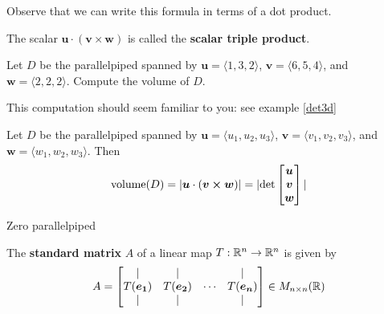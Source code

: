 Observe that we can write this formula in terms of a dot product.

\begin{definition}
        The scalar $\bm{u} \cdot (\bm{v \times w})$ is called the \textbf{scalar triple product}.
\end{definition}

\begin{example}
Let $D$ be the parallelpiped spanned by $\bm{u} = \langle 1, 3, 2 \rangle$, $\bm{v} = \langle 6, 5, 4 \rangle$, and $\bm{w} = \langle 2, 2, 2 \rangle$.  Compute the volume of $D$.

\end{example}

This computation should seem familiar to you: see example \ref{det3d}

\begin{theorem}
    Let $D$ be the parallelpiped spanned by $\bm{u} = \langle u_1, u_2, u_3 \rangle$, $\bm{v} = \langle v_1, v_2, v_3 \rangle$, and $\bm{w} = \langle w_1, w_2, w_3 \rangle$.  Then
    \begin{equation*}
\textnormal{volume}(D) = |\bm{u} \cdot (\bm{v \times w})| = | \textnormal{det}
\begin{bmatrix}
\bm{u} \\
\bm{v} \\
\bm{w} \\
\end{bmatrix}|
\end{equation*}

    \end{theorem}


\begin{example}
    Zero parallelpiped
\end{example}






    \begin{definition}
    The \textbf{standard matrix} $A$ of a linear map $T: \mathbb{R}^n \to \mathbb{R}^n$ is given by
    \begin{equation*}
A = 
\begin{bmatrix}
\vert & \vert & & \vert \\
    T(\bm{e_1})   & T(\bm{e_2}) & \cdots & T(\bm{e_n})  \\
    \vert & \vert & & \vert
\end{bmatrix} \in M_{n \times n}(\mathbb{R})
\end{equation*}
\end{definition}

